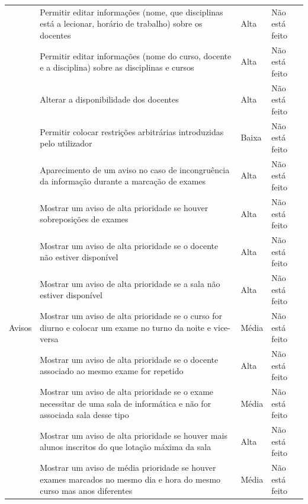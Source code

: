 \documentclass[11pt, twoside]{report}
\begin{document}
\begin{center}
\begin{longtable}{|m{2.2cm}|m{10cm}|m{2cm}|m{2cm}|}
			& Permitir editar informações (nome, que disciplinas está a lecionar, horário de trabalho) sobre os docentes & Alta &Não está feito\\
			
			& Permitir editar informações (nome do curso, docente e a disciplina) sobre as disciplinas e cursos & Alta & Não está feito\\
			
			& Alterar a disponibilidade dos docentes & Alta & Não está feito\\
			
			& Permitir colocar restrições arbitrárias introduzidas pelo utilizador & Baixa & Não está feito\\
			\hline	
			
			\multirow{9}{2cm}{Avisos}& Aparecimento de um aviso no caso de incongruência da informação durante a marcação de exames & Alta & Não está feito\\
			
			&Mostrar um aviso de alta prioridade se houver sobreposições de exames & Alta & Não está feito\\
			
			& Mostrar um aviso de alta prioridade se o docente não estiver disponível & Alta & Não está feito\\
			
			& Mostrar um aviso de alta prioridade se a sala não estiver disponível & Alta & Não está feito\\
			
			& Mostrar um aviso de alta prioridade se o curso for diurno e colocar um exame no turno da noite e vice-versa & Média & Não está feito\\
			
			&Mostrar um aviso de alta prioridade se o docente associado ao mesmo exame for repetido & Alta & Não está feito\\
			
			& Mostrar um aviso de alta prioridade se o exame necessitar de uma sala de informática e não for associada sala desse tipo & Média& Não está feito\\
			
			& Mostrar um aviso de alta prioridade se houver mais alunos inscritos do que  lotação máxima da sala & Alta& Não está feito\\
			
			& Mostrar um aviso de média prioridade se houver exames marcados no mesmo dia e hora do mesmo curso mas anos diferentes & Média& Não está feito\\
			

\end{longtable}
\end{center}
\end{document}

